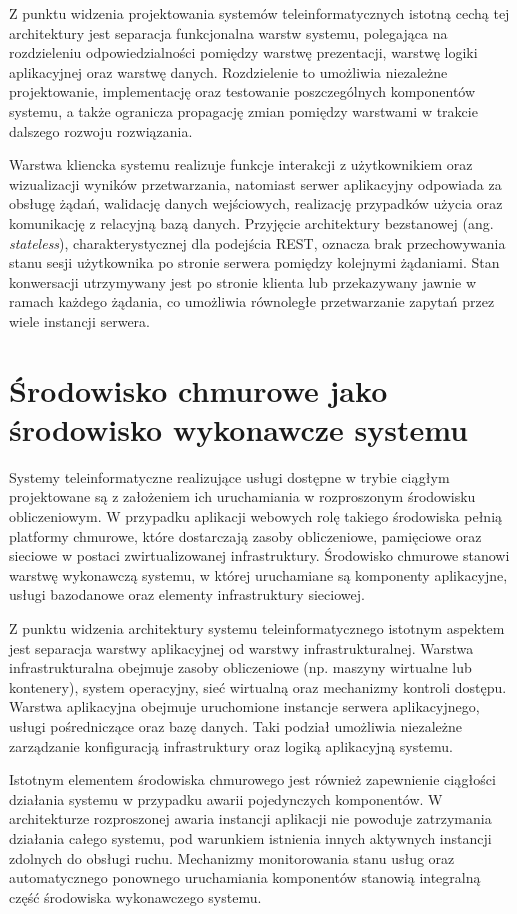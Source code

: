\documentclass[a4paper,twoside,12pt]{book}
\newcommand{\obcy}[1]{\emph{#1}}
\newcommand{\english}[1]{{\selectlanguage{british}\obcy{#1}}}
\begin{document}
Z punktu widzenia projektowania systemów teleinformatycznych istotną cechą tej architektury
jest separacja funkcjonalna warstw systemu, polegająca na rozdzieleniu odpowiedzialności
pomiędzy warstwę prezentacji, warstwę logiki aplikacyjnej oraz warstwę danych.
Rozdzielenie to umożliwia niezależne projektowanie, implementację oraz testowanie
poszczególnych komponentów systemu, a także ogranicza propagację zmian pomiędzy warstwami
w trakcie dalszego rozwoju rozwiązania.

Warstwa kliencka systemu realizuje funkcje interakcji z użytkownikiem oraz wizualizacji
wyników przetwarzania, natomiast serwer aplikacyjny odpowiada za obsługę żądań,
walidację danych wejściowych, realizację przypadków użycia oraz komunikację z relacyjną
bazą danych. Przyjęcie architektury bezstanowej (ang. \english{stateless}),
charakterystycznej dla podejścia REST, oznacza brak przechowywania stanu sesji użytkownika
po stronie serwera pomiędzy kolejnymi żądaniami.
Stan konwersacji utrzymywany jest po stronie klienta lub przekazywany jawnie w ramach
każdego żądania, co umożliwia równoległe przetwarzanie zapytań przez wiele instancji serwera.

\section{Środowisko chmurowe jako środowisko wykonawcze systemu}
Systemy teleinformatyczne realizujące usługi dostępne w trybie ciągłym
projektowane są z założeniem ich uruchamiania w rozproszonym środowisku
obliczeniowym. W przypadku aplikacji webowych rolę takiego środowiska
pełnią platformy chmurowe, które dostarczają zasoby obliczeniowe, pamięciowe
oraz sieciowe w postaci zwirtualizowanej infrastruktury. Środowisko chmurowe
stanowi warstwę wykonawczą systemu, w której uruchamiane są komponenty
aplikacyjne, usługi bazodanowe oraz elementy infrastruktury sieciowej.

Z punktu widzenia architektury systemu teleinformatycznego istotnym aspektem
jest separacja warstwy aplikacyjnej od warstwy infrastrukturalnej.
Warstwa infrastrukturalna obejmuje zasoby obliczeniowe (np. maszyny wirtualne
lub kontenery), system operacyjny, sieć wirtualną oraz mechanizmy kontroli
dostępu. Warstwa aplikacyjna obejmuje uruchomione instancje serwera aplikacyjnego,
usługi pośredniczące oraz bazę danych. Taki podział umożliwia niezależne
zarządzanie konfiguracją infrastruktury oraz logiką aplikacyjną systemu.

Istotnym elementem środowiska chmurowego jest również zapewnienie ciągłości
działania systemu w przypadku awarii pojedynczych komponentów.
W architekturze rozproszonej awaria instancji aplikacji nie powoduje
zatrzymania działania całego systemu, pod warunkiem istnienia innych
aktywnych instancji zdolnych do obsługi ruchu. Mechanizmy monitorowania
stanu usług oraz automatycznego ponownego uruchamiania komponentów
stanowią integralną część środowiska wykonawczego systemu.
\end{document}

